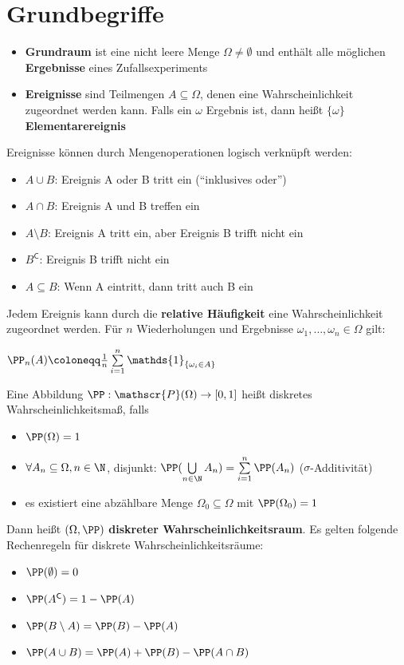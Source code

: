 \section{Grundbegriffe}
\begin{itemize}
	\item \textbf{Grundraum} ist eine nicht leere Menge $\Omega\neq\emptyset$ und enthält alle möglichen \textbf{Ergebnisse} eines Zufallsexperiments
	\item \textbf{Ereignisse} sind Teilmengen $A\subseteq\Omega$, denen eine Wahrscheinlichkeit zugeordnet werden kann. 
	Falls ein $\omega$ Ergebnis ist, dann heißt $\{\omega\}$ \textbf{Elementarereignis}
\end{itemize}
Ereignisse können durch Mengenoperationen logisch verknüpft werden:
\begin{itemize}
	\item $A\cup B$: Ereignis A oder B tritt ein (\enquote{inklusives oder})
	\item $A\cap B$: Ereignis A und B treffen ein
	\item $A\setminus B$: Ereignis A tritt ein, aber Ereignis B trifft nicht ein
	\item $B^{\mathsf{C}}$: Ereignis B trifft nicht ein
	\item $A\subseteq B$: Wenn A eintritt, dann tritt auch B ein
\end{itemize}
Jedem Ereignis kann durch die \textbf{relative Häufigkeit} eine Wahrscheinlichkeit zugeordnet werden. 
Für $n$ Wiederholungen und Ergebnisse $\omega_1,\ldots,\omega_n\in\Omega$ gilt:\\
\begin{tightcenter}
	$\PP_n(A)\coloneqq\frac{1}{n}\sum\limits_{i=1}^{n} \mathds{1}_{\{\omega_i \in A\}}$
\end{tightcenter}

Eine Abbildung $\PP:\mathscr{P}(\Omega) \rightarrow [0,1]$ heißt diskretes Wahrscheinlichkeitsmaß, falls
\begin{itemize}
	\item $\PP(\Omega)=1$
	\item $\forall A_n \subseteq \Omega, n\in\N$, disjunkt: $\PP(\bigcup\limits_{n\in \N} A_n)=\sum\limits_{i=1}^{n} \PP(A_n)$ \null\hfill($\sigma$-Additivität)
	\item es existiert eine abzählbare Menge $\Omega_0\subseteq\Omega$ mit $\PP(\Omega_0)=1$
\end{itemize}
Dann heißt $(\Omega, \PP)$ \textbf{diskreter Wahrscheinlichkeitsraum}.
Es gelten folgende Rechenregeln für diskrete Wahrscheinlichkeitsräume:
\begin{itemize}
	\item $\PP(\emptyset)=0$
	\item $\PP(A^{\mathsf{C}})=1-\PP(A)$
	\item $\PP(B\setminus A) = \PP(B)-\PP(A)$
	\item $\PP(A\cup B)=\PP(A)+\PP(B)-\PP(A\cap B)$
\end{itemize}

